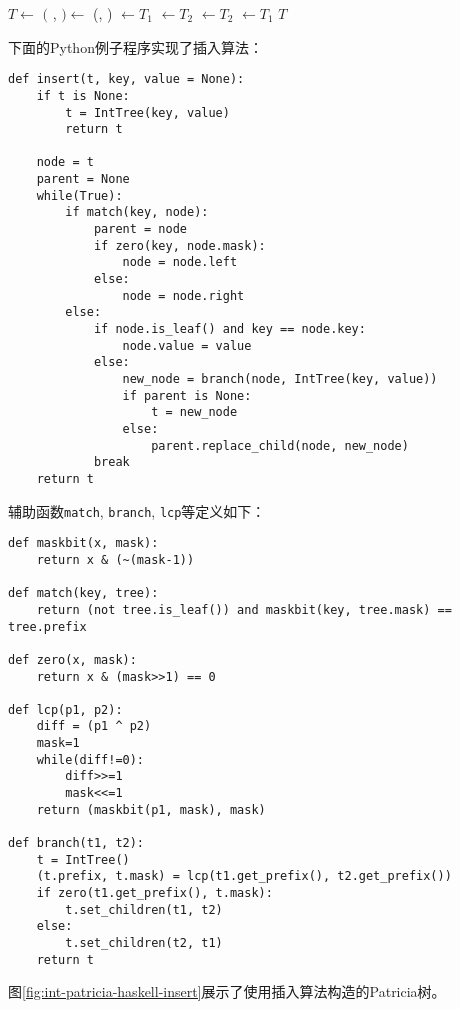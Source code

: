 \documentclass[UTF8]{article}
\begin{document}
\begin{algorithmic}[1]
  \State $T \gets$ 
  \State $($ ,  $) \gets$ (, )
    \State {} $\gets T_1$
    \State {} $\gets T_2$
  \Else
    \State {} $\gets T_2$
    \State {} $\gets T_1$
  \EndIf
  \State \Return $T$
\EndFunction
\end{algorithmic}

下面的Python例子程序实现了插入算法：

\lstset{language=Python}
\begin{lstlisting}
def insert(t, key, value = None):
    if t is None:
        t = IntTree(key, value)
        return t

    node = t
    parent = None
    while(True):
        if match(key, node):
            parent = node
            if zero(key, node.mask):
                node = node.left
            else:
                node = node.right
        else:
            if node.is_leaf() and key == node.key:
                node.value = value
            else:
                new_node = branch(node, IntTree(key, value))
                if parent is None:
                    t = new_node
                else:
                    parent.replace_child(node, new_node)
            break
    return t
\end{lstlisting}

辅助函数\texttt{match}, \texttt{branch}, \texttt{lcp}等定义如下：

\begin{lstlisting}
def maskbit(x, mask):
    return x & (~(mask-1))

def match(key, tree):
    return (not tree.is_leaf()) and maskbit(key, tree.mask) == tree.prefix

def zero(x, mask):
    return x & (mask>>1) == 0

def lcp(p1, p2):
    diff = (p1 ^ p2)
    mask=1
    while(diff!=0):
        diff>>=1
        mask<<=1
    return (maskbit(p1, mask), mask)

def branch(t1, t2):
    t = IntTree()
    (t.prefix, t.mask) = lcp(t1.get_prefix(), t2.get_prefix())
    if zero(t1.get_prefix(), t.mask):
        t.set_children(t1, t2)
    else:
        t.set_children(t2, t1)
    return t
\end{lstlisting}

图\ref{fig:int-patricia-haskell-insert}展示了使用插入算法构造的Patricia树。
\end{document}
